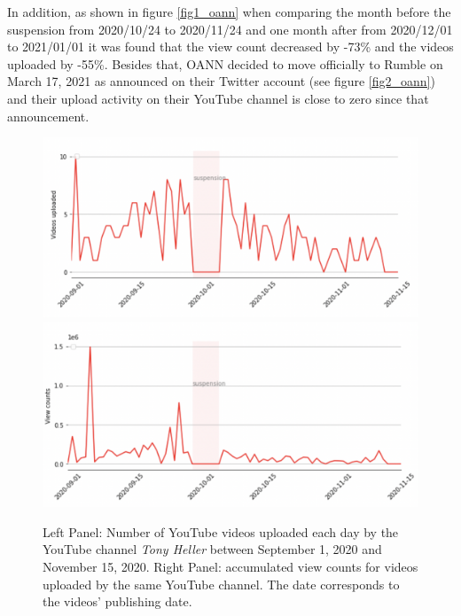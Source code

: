 \documentclass{article}
\begin{document}
In addition, as shown in figure \ref{fig1_oann} when comparing the month before the suspension from 2020/10/24 to 2020/11/24 and one month after from 2020/12/01 to 2021/01/01 it was found that the view count decreased by -73\% and the videos uploaded by -55\%. Besides that, OANN decided to move officially to Rumble on March 17, 2021 as announced on their Twitter account (see figure \ref{fig2_oann}) and their upload activity on their YouTube channel is close to zero since that announcement. 

\begin{figure}[h]
	\centering
			\includegraphics[scale=0.35]{./img/tony/fig1_tony.png}
			\includegraphics[scale=0.34]{./img/tony/fig2_tony.png}
	\caption{Left Panel: Number of YouTube videos uploaded each day by the YouTube channel {\it Tony Heller} between September 1, 2020 and November 15, 2020. Right Panel: accumulated view counts for videos uploaded by the same YouTube channel. The date corresponds to the videos’  publishing date. 
}
	\label{fig1_tony}
\end{figure}
\end{document}
